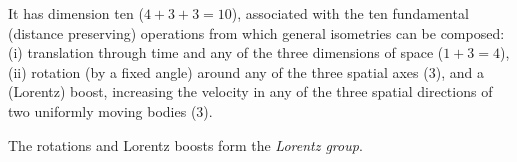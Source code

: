 It has dimension ten ($4+3+3=10$), associated with
the ten fundamental (distance preserving) operations
from which general isometries can be composed:
(i) translation through time and any of the three dimensions of space ($1+3=4$),
(ii) rotation (by a fixed angle) around any of the three spatial axes ($3$),
and a (Lorentz) boost, increasing the velocity
in any of the three spatial directions
of two uniformly moving bodies ($3$).

The rotations and Lorentz boosts form the
{\em  Lorentz group}.


\begin{center}
{\color{olive}   \Huge
 \decosix
}
\end{center}

